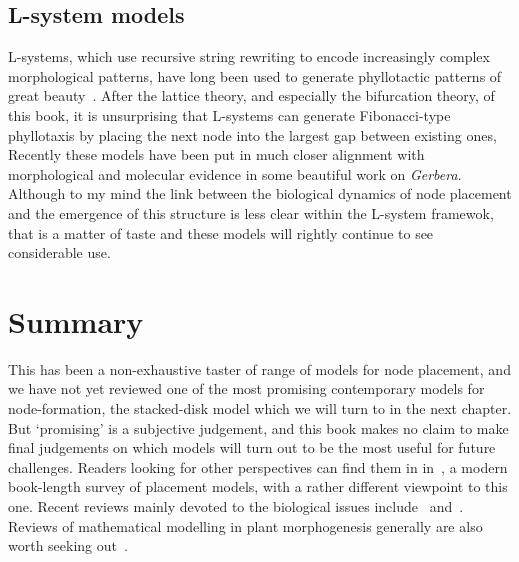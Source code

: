 \subsection{L-system models}
L-systems, which use recursive string rewriting to encode  increasingly complex morphological patterns, have long been used to generate phyllotactic patterns of great beauty~\cite{prusinkiewiczAlgorithmicBeautyPlants1991,prusinkiewiczModelingPlantDevelopment2018}. After the lattice theory, and especially the bifurcation theory, of this book, it is unsurprising that L-systems can generate Fibonacci-type phyllotaxis by placing the next node into the largest gap between existing ones,  Recently these models have been put in much closer alignment with morphological and molecular evidence  in some beautiful work on \textit{Gerbera}\cite{zhangPhyllotacticPatterningGerbera2021}. Although to my mind the link between the biological dynamics of node placement and the emergence of this structure is less clear within the L-system framewok, that is a matter of taste and these models will rightly continue to see considerable use. 



\section{Summary}

This has been a non-exhaustive taster of range of models for node placement, and we have not yet reviewed one of the most promising contemporary models for node-formation, the stacked-disk model which we will turn to in the next chapter. But  `promising' is a subjective judgement, and this book makes no claim to make final judgements on which models will turn out to be the most useful for future
 challenges. 
Readers looking for other perspectives can find them  in in~\autocite{barabePhyllotacticPatternsMultidisciplinary2020}, a modern book-length survey of placement models, with a rather different viewpoint to this one. 
Recent reviews mainly devoted to the biological issues include~\cite{traasPhyllotaxis2013} and~\cite{godinPhyllotaxisGeometricCanalization2020}. Reviews of mathematical modelling in plant morphogenesis generally are also worth seeking out~\cite{prusinkiewiczComputationalModelsPlant2012,MathematicalModellingPlant2018,moscaModelingPlantTissue2018a, prusinkiewiczModelingPlantDevelopment2018}.

 